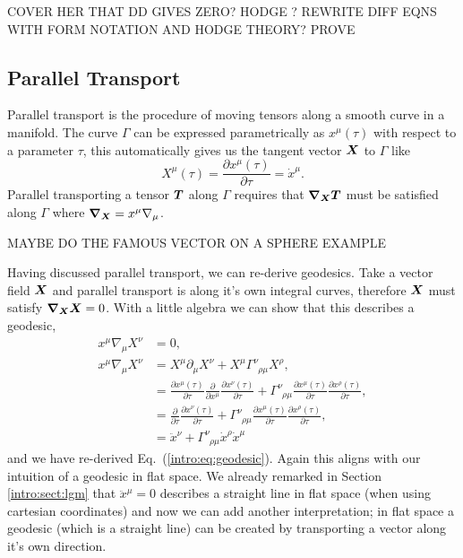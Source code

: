 COVER HER THAT DD GIVES ZERO?
HODGE ? REWRITE DIFF EQNS WITH FORM NOTATION AND HODGE THEORY?
PROVE 




\subsection{Parallel Transport}


Parallel transport is the procedure of moving tensors along a smooth curve in a manifold. The curve $\Gamma$ can be expressed parametrically as $x^\mu(\tau)$ with respect to a parameter $\tau$, this automatically gives us the tangent vector $\boldsymbol{X}$ to $\Gamma$ like 
\begin{equation}
X^\mu(\tau) = \frac{\partial x^\mu(\tau)}{\partial \tau} = \dot{x}^\mu.
\end{equation}
Parallel transporting a tensor $\boldsymbol{T}$ along $\Gamma$ requires that $\boldsymbol{\nabla}_{\boldsymbol{X}} \boldsymbol{T}$ must be satisfied along $\Gamma$ where $\boldsymbol{\nabla}_{\boldsymbol{X}}=x^\mu \nabla_\mu$.

MAYBE DO THE FAMOUS VECTOR ON A SPHERE EXAMPLE

Having discussed parallel transport, we can re-derive geodesics. Take a vector field $\boldsymbol{X}$ and parallel transport is along it's own integral curves, therefore $\boldsymbol{X}$ must satisfy $\boldsymbol{\nabla}_{\boldsymbol{X}}\boldsymbol{X}=0$. With a little algebra we can show that this describes a geodesic,
\begin{align}
x^\mu \nabla_\mu X^\nu &=0, \\
x^\mu \nabla_\mu X^\nu &= X^\mu \partial_\mu X^\nu + X^\mu \Gamma^{\nu}_{\,\,\,\rho\mu}X^\rho, \\
&=\frac{\partial x^\mu(\tau)}{\partial \tau}\frac{\partial}{\partial x^\mu} \frac{\partial x^\nu(\tau)}{\partial \tau} + \Gamma^{\nu}_{\,\,\,\rho\mu}\frac{\partial x^\mu(\tau)}{\partial \tau}\frac{\partial x^\rho(\tau)}{\partial \tau},\\
&=\frac{\partial}{\partial \tau} \frac{\partial x^\nu(\tau)}{\partial \tau} + \Gamma^{\nu}_{\,\,\,\rho\mu}\frac{\partial x^\mu(\tau)}{\partial \tau}\frac{\partial x^\rho(\tau)}{\partial \tau},\\
\label{intro:eq:geo}&= \ddot{x}^\nu + \Gamma^{\nu}_{\,\,\,\rho\mu}\dot{x}^\rho\dot{x}^\mu
\end{align}
and we have re-derived Eq.~(\ref{intro:eq:geodesic}). Again this aligns with our intuition of a geodesic in flat space. We already remarked in Section \ref{intro:sect:lgm} that $\ddot{x}^\mu=0$ describes a straight line in flat space (when using cartesian coordinates) and now we can add another interpretation; in flat space a geodesic (which is a straight line) can be created by transporting a vector along it's own direction.



